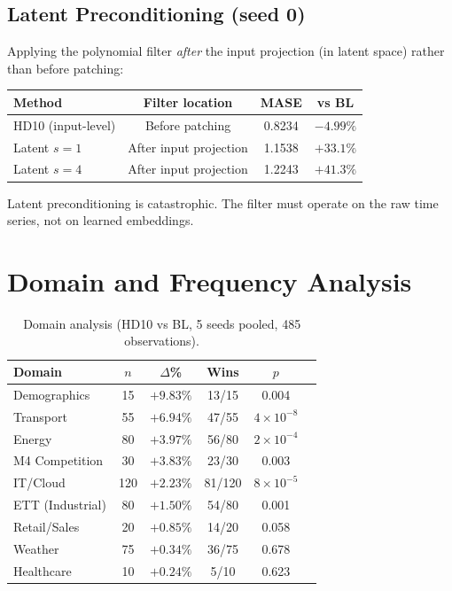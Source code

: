 \documentclass{article}
\begin{document}
\subsection{Latent Preconditioning (seed 0)}

Applying the polynomial filter \emph{after} the input projection (in latent space) rather than before patching:

\begin{table}[h]
\centering
\small
\begin{tabular}{lccc}
\toprule
\textbf{Method} & \textbf{Filter location} & \textbf{MASE} & \textbf{vs BL} \\
\midrule
HD10 (input-level) & Before patching & 0.8234 & $-4.99\%$ \\
Latent $s=1$ & After input projection & 1.1538 & $+33.1\%$ \\
Latent $s=4$ & After input projection & 1.2243 & $+41.3\%$ \\
\bottomrule
\end{tabular}
\end{table}

Latent preconditioning is catastrophic. The filter must operate on the raw time series, not on learned embeddings.

\section{Domain and Frequency Analysis}
\label{app:domain}

\begin{table}[h]
\centering
\caption{Domain analysis (HD10 vs BL, 5 seeds pooled, 485 observations).}
\small
\begin{tabular}{lccccc}
\toprule
\textbf{Domain} & \textbf{$n$} & \textbf{$\Delta$\%} & \textbf{Wins} & \textbf{$p$} \\
\midrule
Demographics & 15 & $+9.83\%$ & 13/15 & 0.004 \\
Transport & 55 & $+6.94\%$ & 47/55 & $4 \times 10^{-8}$ \\
Energy & 80 & $+3.97\%$ & 56/80 & $2 \times 10^{-4}$ \\
M4 Competition & 30 & $+3.83\%$ & 23/30 & 0.003 \\
IT/Cloud & 120 & $+2.23\%$ & 81/120 & $8 \times 10^{-5}$ \\
ETT (Industrial) & 80 & $+1.50\%$ & 54/80 & 0.001 \\
Retail/Sales & 20 & $+0.85\%$ & 14/20 & 0.058 \\
Weather & 75 & $+0.34\%$ & 36/75 & 0.678 \\
Healthcare & 10 & $+0.24\%$ & 5/10 & 0.623 \\
\bottomrule
\end{tabular}
\end{table}
\end{document}
